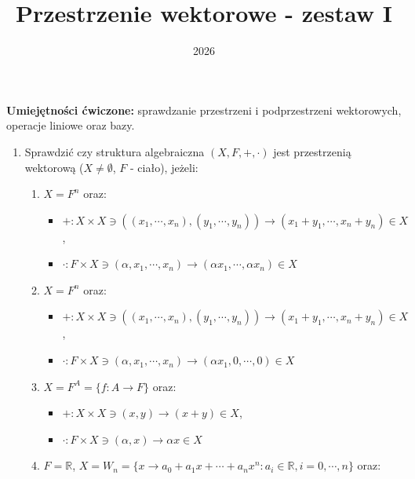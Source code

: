 \documentclass{article}
\title{Przestrzenie wektorowe - zestaw I}
\date{2026}
\begin{document}
\maketitle

\begin{center}
\textbf{Umiejętności ćwiczone:} sprawdzanie przestrzeni i podprzestrzeni wektorowych, operacje liniowe oraz bazy.
\end{center}



\begin{enumerate}
    \item Sprawdzić czy struktura algebraiczna $(X, F, +, \cdot)$ jest przestrzenią wektorową ($X \neq \emptyset$, $F$ - ciało), jeżeli:
        \begin{enumerate}
            \item $X = F^{n}$ oraz:
                \begin{itemize}
                    \item $+ : X \times X \ni ( (x_{1}, \cdots, x_{n}), (y_{1}, \cdots, y_{n}) ) \rightarrow (x_{1}+y_{1}, \cdots, x_{n}+y_{n}) \in X  $,
                    \item $\cdot : F \times X \ni (\alpha, x_{1}, \cdots, x_{n}) \rightarrow (\alpha x_{1}, \cdots, \alpha x_{n}) \in X  $
                \end{itemize}
            \item $X = F^{n}$ oraz:
                \begin{itemize}
                    \item $+ : X \times X \ni ( (x_{1}, \cdots, x_{n}), (y_{1}, \cdots, y_{n}) ) \rightarrow (x_{1}+y_{1}, \cdots, x_{n}+y_{n}) \in X  $,
                    \item $\cdot : F \times X \ni (\alpha, x_{1}, \cdots, x_{n}) \rightarrow (\alpha x_{1}, 0, \cdots, 0) \in X  $
                \end{itemize}
            \item $X = F^{A} = \{ f : A \rightarrow F \}$ oraz:
                \begin{itemize}
                    \item $+ : X \times X \ni ( x, y) \rightarrow ( x + y) \in X  $,
                    \item $\cdot : F \times X \ni (\alpha, x) \rightarrow \alpha x \in X  $
                \end{itemize}
            \item $F = \mathbb{R}$, $X = W_{n} = \{ x \rightarrow a_{0} + a_{1}x + \cdots + a_{n}x^{n}: a_{i} \in \mathbb{R}, i = 0, \cdots, n \}$ oraz:

\end{enumerate}
\end{enumerate}
\end{document}
